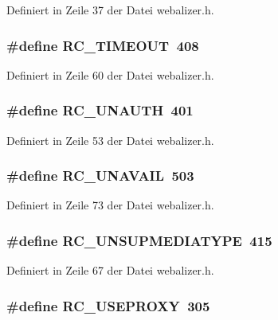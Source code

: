 Definiert in Zeile 37 der Datei webalizer.h.
\subsubsection{\setlength{\rightskip}{0pt plus 5cm}\#define RC\_\-TIMEOUT~408}\label{webalizer_8h_d434474a429a400a76b36167c2883eb0}




Definiert in Zeile 60 der Datei webalizer.h.
\subsubsection{\setlength{\rightskip}{0pt plus 5cm}\#define RC\_\-UNAUTH~401}\label{webalizer_8h_77accf4be7686d8af84c6629d04176ae}




Definiert in Zeile 53 der Datei webalizer.h.
\subsubsection{\setlength{\rightskip}{0pt plus 5cm}\#define RC\_\-UNAVAIL~503}\label{webalizer_8h_1be4e098cbdf953b61ea3e9014b04179}




Definiert in Zeile 73 der Datei webalizer.h.
\subsubsection{\setlength{\rightskip}{0pt plus 5cm}\#define RC\_\-UNSUPMEDIATYPE~415}\label{webalizer_8h_816d51d9feb10e5a9aeeb0e10029b280}




Definiert in Zeile 67 der Datei webalizer.h.
\subsubsection{\setlength{\rightskip}{0pt plus 5cm}\#define RC\_\-USEPROXY~305}\label{webalizer_8h_ffbf5096b0418235f7c14eec29c4aa0f}




